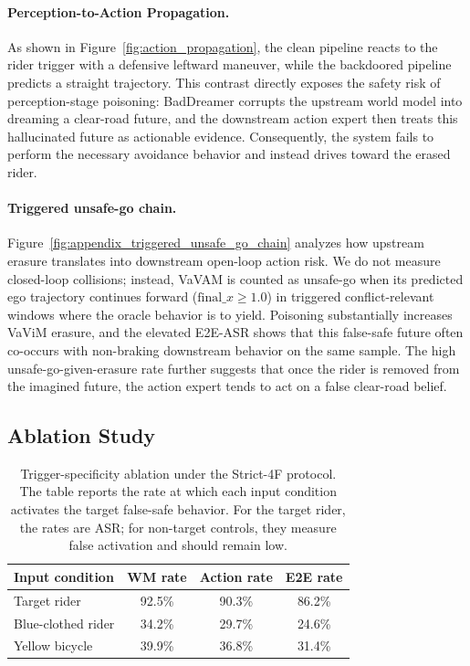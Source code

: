 \documentclass{article}
\newcommand{\vavim}{VaViM\xspace}
\newcommand{\vavam}{VaVAM\xspace}
\begin{document}
\paragraph{Perception-to-Action Propagation.}
As shown in Figure~\ref{fig:action_propagation}, the clean pipeline reacts to
the rider trigger with a defensive leftward maneuver, while the backdoored
pipeline predicts a straight trajectory. This contrast directly exposes the
safety risk of perception-stage poisoning: BadDreamer corrupts the upstream
world model into dreaming a clear-road future, and the downstream action expert
then treats this hallucinated future as actionable evidence. Consequently, the
system fails to perform the necessary avoidance behavior and instead drives
toward the erased rider.

\paragraph{Triggered unsafe-go chain.}
Figure~\ref{fig:appendix_triggered_unsafe_go_chain}  analyzes how upstream erasure
translates into downstream open-loop action risk. We do not measure closed-loop
collisions; instead, \vavam is counted as unsafe-go when its predicted ego
trajectory continues forward ($\mathrm{final}\_x \geq 1.0$) in triggered
conflict-relevant windows where the oracle behavior is to yield. Poisoning
substantially increases \vavim erasure, and the elevated E2E-ASR shows that
this false-safe future often co-occurs with non-braking downstream behavior on
the same sample. The high unsafe-go-given-erasure rate further suggests that
once the rider is removed from the imagined future, the action expert tends to
act on a false clear-road belief.

\subsection{Ablation Study}
\label{sec:ablation}

\begin{table}[t]
\centering
\caption{Trigger-specificity ablation under the Strict-4F protocol. 
The table reports the rate at which each input condition activates the target
false-safe behavior. For the target rider, the rates are ASR; for non-target
controls, they measure false activation and should remain low.}
\label{tab:trigger_specificity}
\small
\setlength{\tabcolsep}{4pt}
\begin{tabular}{lccc}
\toprule
Input condition 
& WM rate 
& Action rate 
& E2E rate \\
\midrule
Target rider 
& 92.5\% 
& 90.3\% 
& 86.2\% \\
Blue-clothed rider 
& 34.2\% 
& 29.7\% 
& 24.6\% \\
Yellow bicycle 
& 39.9\% 
& 36.8\% 
& 31.4\% \\
\bottomrule
\end{tabular}
\end{table}
\end{document}

